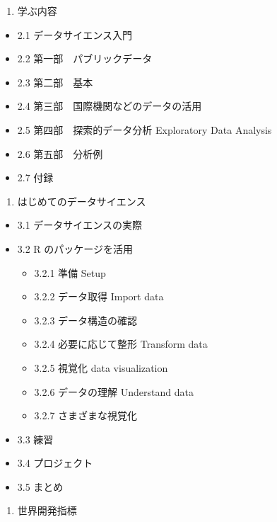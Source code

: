\documentclass[
  xelatex, ja=standard]{bxjsbook}
\providecommand{\tightlist}{%
  \setlength{\itemsep}{0pt}\setlength{\parskip}{0pt}}
\theoremstyle{definition}
\theoremstyle{definition}
\theoremstyle{definition}
\theoremstyle{definition}
\theoremstyle{remark}
\begin{document}
\begin{enumerate}
\def\labelenumi{\arabic{enumi}.}
\setcounter{enumi}{1}
\tightlist
\item
  学ぶ内容　
\end{enumerate}

\begin{itemize}
\tightlist
\item
  2.1 データサイエンス入門
\item
  2.2 第一部　パブリックデータ
\item
  2.3 第二部　基本
\item
  2.4 第三部　国際機関などのデータの活用
\item
  2.5 第四部　探索的データ分析 Exploratory Data Analysis
\item
  2.6 第五部　分析例
\item
  2.7 付録
\end{itemize}

\begin{enumerate}
\def\labelenumi{\arabic{enumi}.}
\setcounter{enumi}{2}
\tightlist
\item
  はじめてのデータサイエンス
\end{enumerate}

\begin{itemize}
\tightlist
\item
  3.1 データサイエンスの実際
\item
  3.2 R のパッケージを活用

  \begin{itemize}
  \tightlist
  \item
    3.2.1 準備 Setup
  \item
    3.2.2 データ取得 Import data
  \item
    3.2.3 データ構造の確認
  \item
    3.2.4 必要に応じて整形 Transform data
  \item
    3.2.5 視覚化 data visualization
  \item
    3.2.6 データの理解 Understand data
  \item
    3.2.7 さまざまな視覚化
  \end{itemize}
\item
  3.3 練習
\item
  3.4 プロジェクト
\item
  3.5 まとめ
\end{itemize}

\begin{enumerate}
\def\labelenumi{\arabic{enumi}.}
\setcounter{enumi}{3}
\tightlist
\item
  世界開発指標
\end{enumerate}
\end{document}
